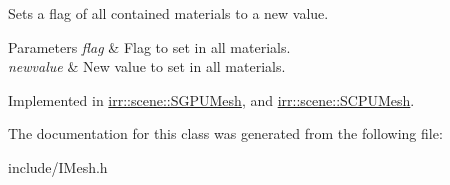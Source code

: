 Sets a flag of all contained materials to a new value. 


\begin{DoxyParams}{Parameters}
{\em flag} & Flag to set in all materials. \\
\hline
{\em newvalue} & New value to set in all materials. \\
\hline
\end{DoxyParams}


Implemented in \hyperlink{classirr_1_1scene_1_1SGPUMesh_a8cbba306dc9fc44460808ff4c9d925be}{irr\+::scene\+::\+S\+G\+P\+U\+Mesh}, and \hyperlink{classirr_1_1scene_1_1SCPUMesh_a3f151b1292b1e0aa70cde8f50793d85c}{irr\+::scene\+::\+S\+C\+P\+U\+Mesh}.



The documentation for this class was generated from the following file\+:\begin{DoxyCompactItemize}
\item 
include/I\+Mesh.\+h\end{DoxyCompactItemize}
